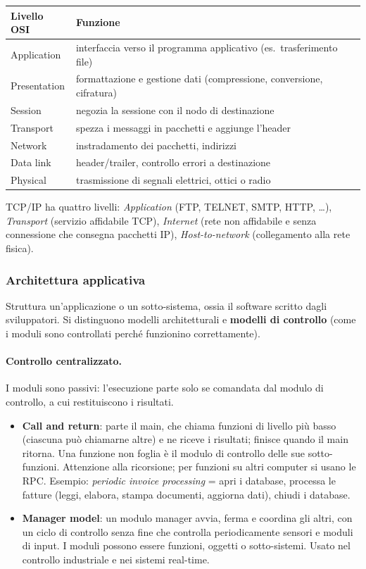 \documentclass[a4paper,12pt]{article}
\begin{document}
\begin{center}
\begin{tabular}{|l|p{11.5cm}|}
\hline
\textbf{Livello OSI} & \textbf{Funzione}\\
\hline
Application & interfaccia verso il programma applicativo (es.\ trasferimento file)\\
Presentation & formattazione e gestione dati (compressione, conversione, cifratura)\\
Session & negozia la sessione con il nodo di destinazione\\
Transport & spezza i messaggi in pacchetti e aggiunge l'header\\
Network & instradamento dei pacchetti, indirizzi\\
Data link & header/trailer, controllo errori a destinazione\\
Physical & trasmissione di segnali elettrici, ottici o radio\\
\hline
\end{tabular}
\end{center}
TCP/IP ha quattro livelli: \emph{Application} (FTP, TELNET, SMTP, HTTP, \ldots),
\emph{Transport} (servizio affidabile TCP), \emph{Internet} (rete non affidabile e
senza connessione che consegna pacchetti IP), \emph{Host-to-network} (collegamento alla
rete fisica).

\subsubsection{Architettura applicativa}
Struttura un'applicazione o un sotto-sistema, ossia il software scritto dagli
sviluppatori. Si distinguono modelli architetturali e \textbf{modelli di controllo} (come
i moduli sono controllati perché funzionino correttamente).

\paragraph{Controllo centralizzato.} I moduli sono passivi: l'esecuzione parte solo se
comandata dal modulo di controllo, a cui restituiscono i risultati.
\begin{itemize}
  \item \textbf{Call and return}: parte il main, che chiama funzioni di livello più basso
        (ciascuna può chiamarne altre) e ne riceve i risultati; finisce quando il main
        ritorna. Una funzione non foglia è il modulo di controllo delle sue sotto-funzioni.
        Attenzione alla ricorsione; per funzioni su altri computer si usano le RPC.
        Esempio: \emph{periodic invoice processing} = apri i database, processa le fatture
        (leggi, elabora, stampa documenti, aggiorna dati), chiudi i database.
  \item \textbf{Manager model}: un modulo manager avvia, ferma e coordina gli altri, con
        un ciclo di controllo senza fine che controlla periodicamente sensori e moduli di
        input. I moduli possono essere funzioni, oggetti o sotto-sistemi. Usato nel
        controllo industriale e nei sistemi real-time.
\end{itemize}
\end{document}
